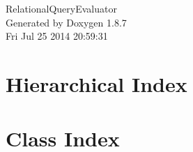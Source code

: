 \documentclass[twoside]{book}
\newcommand{\+}{\discretionary{\mbox{\scriptsize$\hookleftarrow$}}{}{}}
\newcommand{\clearemptydoublepage}{%
  \newpage{\pagestyle{empty}\cleardoublepage}%
}
\begin{document}
\hypersetup{pageanchor=false,
             bookmarks=true,
             bookmarksnumbered=true,
             pdfencoding=unicode
            }
\begin{titlepage}
\vspace*{7cm}
\begin{center}%
{\Large Relational\+Query\+Evaluator }\\
\vspace*{1cm}
{\large Generated by Doxygen 1.8.7}\\
\vspace*{0.5cm}
{\small Fri Jul 25 2014 20:59:31}\\
\end{center}
\end{titlepage}
\clearemptydoublepage
\tableofcontents
\clearemptydoublepage
{}
\hypersetup{pageanchor=true}

\chapter{Hierarchical Index}

\chapter{Class Index}

\end{document}

